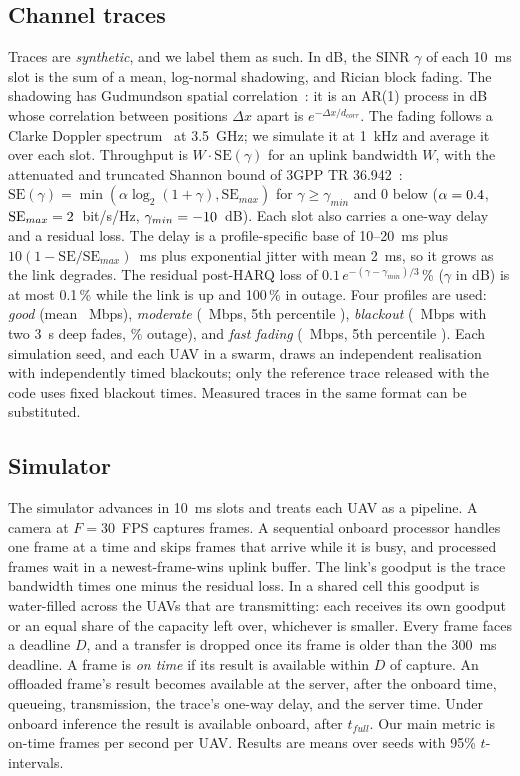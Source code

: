 \documentclass[journal,twocolumn,10pt]{IEEEtran}
\begin{document}
\subsection{Channel traces}
Traces are \emph{synthetic}, and we label them as such. In dB, the SINR $\gamma$ of each 10~ms slot is the sum of a mean, log-normal shadowing, and Rician block fading. The shadowing has Gudmundson spatial correlation~\cite{gudmundson1991correlation}: it is an AR(1) process in dB whose correlation between positions $\Delta x$ apart is $e^{-\Delta x/d_{corr}}$. The fading follows a Clarke Doppler spectrum~\cite{clarke1968statistical} at 3.5~GHz; we simulate it at 1~kHz and average it over each slot. Throughput is $W\cdot\mathrm{SE}(\gamma)$ for an uplink bandwidth $W$, with the attenuated and truncated Shannon bound of 3GPP TR 36.942~\cite{3gpp36942}: $\mathrm{SE}(\gamma)=\min(\alpha\log_2(1+\gamma),\mathrm{SE}_{max})$ for $\gamma\ge\gamma_{min}$ and 0 below ($\alpha=0.4$, $\mathrm{SE}_{max}=2$~bit/s/Hz, $\gamma_{min}=-10$~dB). Each slot also carries a one-way delay and a residual loss. The delay is a profile-specific base of 10--20~ms plus $10(1-\mathrm{SE}/\mathrm{SE}_{max})$~ms plus exponential jitter with mean 2~ms, so it grows as the link degrades. The residual post-HARQ loss of $0.1\,e^{-(\gamma-\gamma_{min})/3}$\,\% ($\gamma$ in dB) is at most 0.1\,\% while the link is up and 100\,\% in outage. Four profiles are used: \emph{good} (mean \TraceGoodMeanMbps~Mbps), \emph{moderate} (\TraceModerateMeanMbps~Mbps, 5th percentile \TraceModeratePFiveMbps), \emph{blackout} (\TraceBlackoutMeanMbps~Mbps with two 3~s deep fades, \TraceBlackoutOutagePct\% outage), and \emph{fast fading} (\TraceFadingMeanMbps~Mbps, 5th percentile \TraceFadingPFiveMbps). Each simulation seed, and each UAV in a swarm, draws an independent realisation with independently timed blackouts; only the reference trace released with the code uses fixed blackout times. Measured traces in the same format can be substituted.

\subsection{Simulator}
The simulator advances in 10~ms slots and treats each UAV as a pipeline. A camera at $F=30$~FPS captures frames. A sequential onboard processor handles one frame at a time and skips frames that arrive while it is busy, and processed frames wait in a newest-frame-wins uplink buffer. The link's goodput is the trace bandwidth times one minus the residual loss. In a shared cell this goodput is water-filled across the UAVs that are transmitting: each receives its own goodput or an equal share of the capacity left over, whichever is smaller. Every frame faces a deadline $D$, and a transfer is dropped once its frame is older than the 300~ms deadline. A frame is \emph{on time} if its result is available within $D$ of capture. An offloaded frame's result becomes available at the server, after the onboard time, queueing, transmission, the trace's one-way delay, and the server time. Under onboard inference the result is available onboard, after $t_{full}$. Our main metric is on-time frames per second per UAV. Results are means over \NumSeeds{} seeds with 95\% $t$-intervals.
\end{document}
